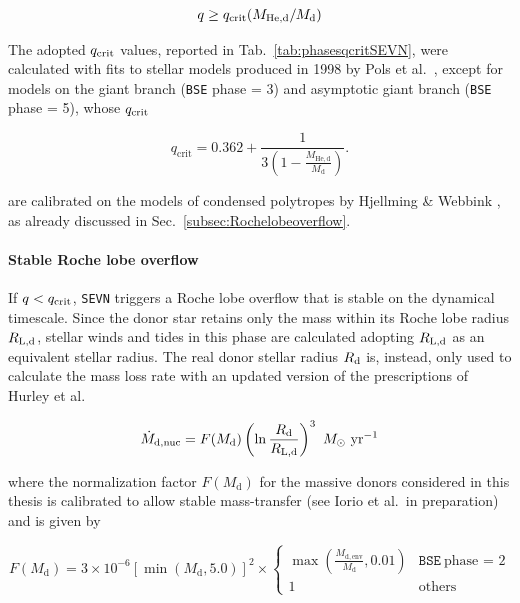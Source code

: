 \documentclass[a4paper,titlepage]{book}     	%
\newcommand{\sun}{\ensuremath{_\odot}}
\newcommand{\mdot}{\ensuremath{\dot{M}}}
\newcommand{\msun}{\ensuremath{M\sun}}
\newcommand{\yr}{\text{yr}}
\begin{document}
\begin{equation}
    q \geq q_{\rm crit}(M_{\rm He,d}/M_{\rm d})
\end{equation}

The adopted $q_{\rm crit}$ values, reported in Tab.\ \ref{tab:phasesqcritSEVN}, were calculated with fits to stellar models produced in 1998 by Pols et al.\ \cite{Pols1998evotracks}, except for models on the giant branch (\texttt{BSE} phase = 3) and asymptotic giant branch (\texttt{BSE} phase = 5), whose $q_{\rm crit}$ 

\begin{equation}\label{eq:qcritgiants}
   q_\mathrm{crit} = 0.362 + \frac{1}{3\left(1-\frac{M_\mathrm{He,d}}{M_\mathrm{d}}\right)}.
\end{equation}

are calibrated on the  models of condensed polytropes by Hjellming \& Webbink \cite{hjellmingwebbink1987_coreRLOF}, as already discussed in Sec.\ \ref{subsec:Rochelobeoverflow}.


\paragraph{Stable Roche lobe overflow} If $q < q_{\rm crit}$, \texttt{SEVN} triggers a Roche lobe overflow that is stable on the dynamical timescale. Since the donor star retains only the mass within its Roche lobe radius $R_{\rm L,d}$, stellar winds and tides in this phase are calculated adopting $R_{\rm L,d}$ as an equivalent stellar radius. The real donor stellar radius $R_{\rm d}$ is, instead, only used to calculate the mass loss rate with an updated version of the prescriptions of Hurley et al.\ \cite{Hurley2002}

\begin{equation}\label{eq:masslossrateRLSEVN}
\mdot_{\rm d, nuc} = F(M_\mathrm{d}) \left( \ln \frac{R_\mathrm{d}}{R_\mathrm{L,d}} \right)^3~\msun~\yr^{-1} 
\end{equation}


where the normalization factor $F(M_\mathrm{d})$ for the massive donors considered in this thesis is calibrated to allow stable mass-transfer (see Iorio et al.\ in preparation) and is given by

\begin{equation*}
F(M_\mathrm{d}) =  3 \times 10^{-6} \left[ \min \left( M_\mathrm{d}, 5.0 \right) \right]^2 \times
\begin{cases}
\max \left( \frac{M_\mathrm{d, env}}{M_\mathrm{d}} ,0.01 \right) & \texttt{BSE} ~\text{phase = 2} \\
1 & \text{others}
\end{cases}
\end{equation*}
\end{document}
